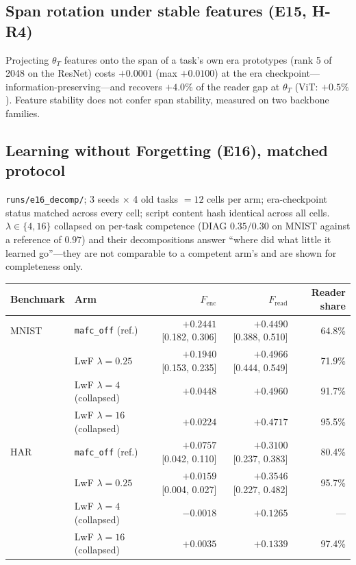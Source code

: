 \subsection{Span rotation under stable features (E15, H-R4)}

Projecting $\theta_T$ features onto the span of a task's own era prototypes
(rank 5 of 2048 on the ResNet) costs $+0.0001$ (max $+0.0100$) at the era
checkpoint---information-preserving---and recovers $+4.0\%$ of the reader gap at
$\theta_T$ (ViT: $+0.5\%$). Feature stability does not confer span stability,
measured on two backbone families.

\subsection{Learning without Forgetting (E16), matched protocol}

\texttt{runs/e16\_decomp/}; 3 seeds $\times$ 4 old tasks $= 12$ cells per arm;
era-checkpoint status matched across every cell; script content hash identical
across all cells. $\lambda \in \{4, 16\}$ collapsed on per-task competence
(DIAG $0.35/0.30$ on MNIST against a reference of $0.97$) and their
decompositions answer ``where did what little it learned go''---they are not
comparable to a competent arm's and are shown for completeness only.

\begin{center}\small
\begin{tabular}{@{}llrrr@{}}
\toprule
Benchmark & Arm & $F_{\mathrm{enc}}$ & $F_{\mathrm{read}}$ & Reader share \\
\midrule
MNIST & \texttt{mafc\_off} (ref.) & $+0.2441$ [0.182, 0.306] & $+0.4490$ [0.388, 0.510] & 64.8\% \\
      & LwF $\lambda{=}0.25$      & $+0.1940$ [0.153, 0.235] & $+0.4966$ [0.444, 0.549] & 71.9\% \\
      & LwF $\lambda{=}4$ (collapsed)  & $+0.0448$ & $+0.4960$ & 91.7\% \\
      & LwF $\lambda{=}16$ (collapsed) & $+0.0224$ & $+0.4717$ & 95.5\% \\
\midrule
HAR   & \texttt{mafc\_off} (ref.) & $+0.0757$ [0.042, 0.110] & $+0.3100$ [0.237, 0.383] & 80.4\% \\
      & LwF $\lambda{=}0.25$      & $+0.0159$ [0.004, 0.027] & $+0.3546$ [0.227, 0.482] & 95.7\% \\
      & LwF $\lambda{=}4$ (collapsed)  & $-0.0018$ & $+0.1265$ & --- \\
      & LwF $\lambda{=}16$ (collapsed) & $+0.0035$ & $+0.1339$ & 97.4\% \\
\bottomrule
\end{tabular}
\end{center}

